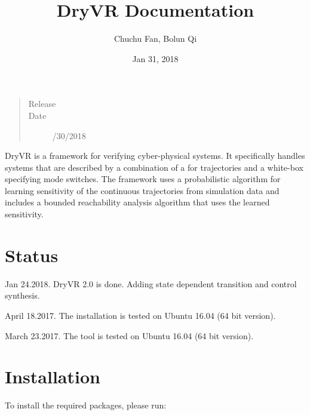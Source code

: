 \documentclass[letterpaper,10pt,english]{sphinxmanual}
\title{DryVR Documentation}
\date{Jan 31, 2018}
\author{Chuchu Fan, Bolun Qi}
\begin{document}
\maketitle
\sphinxtableofcontents
{}\label{\detokenize{index::doc}}

\begin{quote}\begin{description}
\item[{Release}] 

\item[{Date}] /30/2018

\end{description}\end{quote}

DryVR is a framework for verifying cyber-physical systems. It specifically handles systems that are described by a combination of a {\hyperref[\detokenize{dryvr's_language:black-box-label}]{}} for trajectories and a white-box {\hyperref[\detokenize{dryvr's_language:transition-graph-label}]{}} specifying mode switches. The framework uses a probabilistic algorithm for learning sensitivity of the continuous trajectories from simulation data and includes a bounded reachability analysis algorithm that uses the learned sensitivity.


\chapter{Status}
\label{\detokenize{status:status}}\label{\detokenize{status::doc}}\label{\detokenize{status:welcome-to-dryvr-s-user-manual}}
Jan 24.2018. DryVR 2.0 is done. Adding state dependent transition and control synthesis.

April 18.2017. The installation is tested on Ubuntu 16.04 (64 bit version).

March 23.2017. The tool is tested on Ubuntu 16.04 (64 bit version).


\chapter{Installation}
\label{\detokenize{installtion:installation}}\label{\detokenize{installtion::doc}}
To install the required packages, please run:

\begin{sphinxVerbatim}[commandchars=\\\{\}]
 
\end{sphinxVerbatim}
\end{document}
